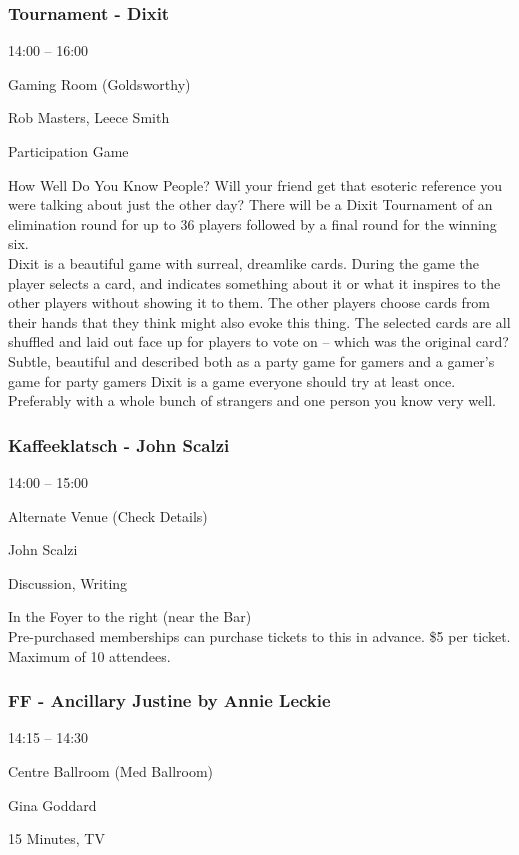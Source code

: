 \documentclass{scrreprt}
\begin{document}
\begin{multicols}{2}
\subsubsection*{Tournament - Dixit}\begin{description}
\setlength{\itemsep}{0pt}
\setlength{\parsep}{0pt}
\setlength{\parskip}{0pt}
\item[Time:]{14:00 -- 16:00}
\item[Venue:]{Gaming Room (Goldsworthy)}
\item[People:]{Rob Masters, Leece Smith}
\item[Tags:]{Participation Game}\end{description}
How Well Do You Know People? Will your friend get that esoteric reference you were talking about just the other day? There will be a Dixit Tournament of an elimination round for up to 36 players followed by a final round for the winning six.\\Dixit is a beautiful game with surreal, dreamlike cards. During the game the player selects a card, and indicates something about it or what it inspires to the other players without showing it to them. The other players choose cards from their hands that they think might also evoke this thing. The selected cards are all shuffled and laid out face up for players to vote on – which was the original card? Subtle, beautiful and described both as a party game for gamers and a gamer's game for party gamers Dixit is a game everyone should try at least once. Preferably with a whole bunch of strangers and one person you know very well.
\subsubsection*{Kaffeeklatsch - John Scalzi}\begin{description}
\setlength{\itemsep}{0pt}
\setlength{\parsep}{0pt}
\setlength{\parskip}{0pt}
\item[Time:]{14:00 -- 15:00}
\item[Venue:]{Alternate Venue (Check Details)}
\item[People:]{John Scalzi}
\item[Tags:]{Discussion, Writing}\end{description}
In the Foyer to the right (near the Bar) \\Pre-purchased memberships can purchase tickets to this in advance. \$5 per ticket. Maximum of 10 attendees.
\subsubsection*{FF - Ancillary Justine by Annie Leckie}\begin{description}
\setlength{\itemsep}{0pt}
\setlength{\parsep}{0pt}
\setlength{\parskip}{0pt}
\item[Time:]{14:15 -- 14:30}
\item[Venue:]{Centre Ballroom (Med Ballroom)}
\item[People:]{Gina Goddard}
\item[Tags:]{15 Minutes, TV}\end{description}


\end{multicols}
\end{document}
